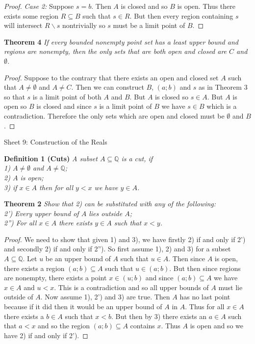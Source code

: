 \documentclass{article}
\begin{document}
\begin{flushleft}
\begin{proof}
\textit{Case 2:} Suppose $s=b$. Then $A$ is closed and so $B$ is open. Thus there exists some region $R \subseteq B$ such that $s \in R$. But then every region containing $s$ will intersect $R \backslash s$ nontrivially so $s$ must be a limit point of  $B$.
\end{proof}

\textbf{Theorem 4}
\textsl{If every bounded nonempty point set has a least upper bound and regions are nonempty, then the only sets that are both open and closed are $C$ and $\emptyset$.}
\begin{proof}
Suppose to the contrary that there exists an open and closed set $A$ such that $A \neq \emptyset$ and $A \neq C$. Then we can construct $B$, $(a;b)$ and $s$ as in Theorem 3 so that $s$ is a limit point of both $A$ and $B$. But $A$ is closed so $s \in A$. But $A$ is open so $B$ is closed and since $s$ is a limit point of $B$ we have $s \in B$ which is a contradiction. Therefore the only sets which are open and closed must be $\emptyset$ and $B$.
\end{proof}

\newpage

\Large

Sheet 9: Construction of the Reals\newline

\normalsize

\textbf{Definition 1 (Cuts)}
\textsl{A subset $A \subseteq \mathbb{Q}$ is a cut, if\\
1) $A \neq \emptyset$ and $A \neq \mathbb{Q}$;\\
2) $A$ is open;\\
3) if $x \in A$ then for all $y<x$ we have $y \in A$.}
\newline

\textbf{Theorem 2}
\textsl{Show that 2) can be substituted with any of the following:\\
2') Every upper bound of $A$ lies outside $A$;\\
2'') For all $x \in A$ there exists $y \in A$ such that $x < y$.}
\begin{proof}
We need to show that given 1) and 3), we have firstly 2) if and only if 2') and secondly 2) if and only if 2''). So first assume 1), 2) and 3) for a subset $A \subseteq \mathbb{Q}$. Let $u$ be an upper bound of $A$ such that $u \in A$. Then since $A$ is open, there exists a region $(a;b) \subseteq A$ such that $u \in (a;b)$. But then since regions are nonempty, there exists a point $x \in (u;b)$ and since $(a;b) \subseteq A$ we have $x \in A$ and $u<x$. This is a contradiction and so all upper bounds of $A$ must lie outside of $A$. Now assume 1), 2') and 3) are true. Then $A$ has no last point because if it did then it would be an upper bound of $A$ in $A$. Thus for all $x \in A$ there exists a $b \in A$ such that $x<b$. But then by 3) there exists an $a \in A$ such that $a<x$ and so the region $(a;b) \subseteq A$ contains $x$. Thus $A$ is open and so we have 2) if and only if 2').\newline


\end{proof}
\end{flushleft}
\end{document}
